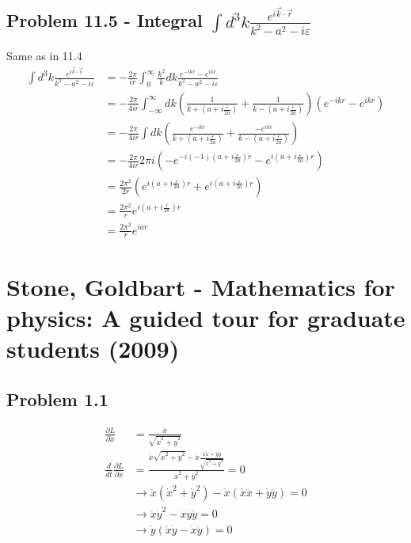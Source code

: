 \documentclass[../main.tex]{subfiles}
\begin{document}
\subsection{Problem 11.5 - Integral $\int d^3k \frac{e^{i\vec{k}\cdot\vec{r}}}{k^2-a^2-i\varepsilon}$}
Same as in 11.4
\begin{align}
\int d^3k \frac{e^{i\vec{k}\cdot\vec{r}}}{k^2-a^2-i\varepsilon}
&=-\frac{2\pi}{ir}\int_0^\infty \frac{k^2}{k}dk \frac{e^{-ikr}-e^{ikr}}{k^2-a^2-i\varepsilon}\\
&=-\frac{2\pi}{4ir}\int_{-\infty}^\infty dk \left(\frac{1}{k+(a+i\frac{\varepsilon}{2a})}+\frac{1}{k-(a+i\frac{\varepsilon}{2a})}\right)(e^{-ikr}-e^{ikr})\\
&=-\frac{2\pi}{4ir}\int dk \left(\frac{e^{-ikr}}{k+(a+i\frac{\varepsilon}{2a})}+\frac{-e^{ikr}}{k-(a+i\frac{\varepsilon}{2a})}\right)\\
&=-\frac{2\pi}{4ir}2\pi i\left(-e^{-i(-1)(a+i\frac{\varepsilon}{2a})r}-e^{i(a+i\frac{\varepsilon}{2a})r}\right)\\
&=\frac{2\pi^2}{2r}\left(e^{i(a+i\frac{\varepsilon}{2a})r}+e^{i(a+i\frac{\varepsilon}{2a})r}\right)\\
&=\frac{2\pi^2}{r}e^{i(a+i\frac{\varepsilon}{2a})r}\\
&=\frac{2\pi^2}{r}e^{iar}
\end{align}


\section{{\sc Stone, Goldbart} - Mathematics for physics: A guided tour for graduate students (2009)}
\subsection{Problem 1.1}
\begin{align}
\frac{\partial L}{\partial \dot{x}}
&=\frac{\dot{x}}{\sqrt{\dot{x}^2+\dot{y}^2}}\\
\frac{d}{dt}\frac{\partial L}{\partial \dot{x}}&=\frac{\ddot{x}\sqrt{\dot{x}^2+\dot{y}^2}-\dot{x}\frac{\dot{x}\ddot{x}+\dot{y}\ddot{y}}{\sqrt{\dot{x}^2+\dot{y}^2}}}{\dot{x}^2+\dot{y}^2}=0\\
&\rightarrow \ddot{x}(\dot{x}^2+\dot{y}^2)-\dot{x}(\dot{x}\ddot{x}+\dot{y}\ddot{y})=0\\
&\rightarrow \ddot{x}\dot{y}^2-\dot{x}\dot{y}\ddot{y}=0\\
&\rightarrow \dot{y}(\ddot{x}\dot{y}-\dot{x}\ddot{y})=0\\
\end{align}
\end{document}
